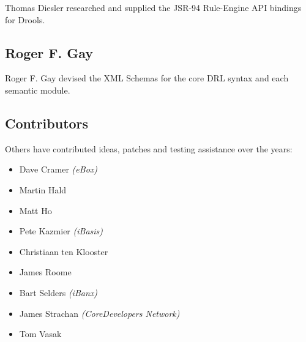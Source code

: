 Thomas Diesler researched and supplied the JSR-94 Rule-Engine API
bindings for Drools.

\subsection{Roger F. Gay}

Roger F. Gay devised the XML Schemas for the core DRL syntax and
each semantic module.

\subsection{Contributors}

Others have contributed ideas, patches and testing assistance
over the years:

\begin{itemize}
  \item Dave Cramer \emph{(eBox)}
  \item Martin Hald
  \item Matt Ho
  \item Pete Kazmier \emph{(iBasis)}
  \item Christiaan ten Klooster
  \item James Roome
  \item Bart Selders \emph{(iBanx)}
  \item James Strachan \emph{(CoreDevelopers Network)}
  \item Tom Vasak
\end{itemize}

